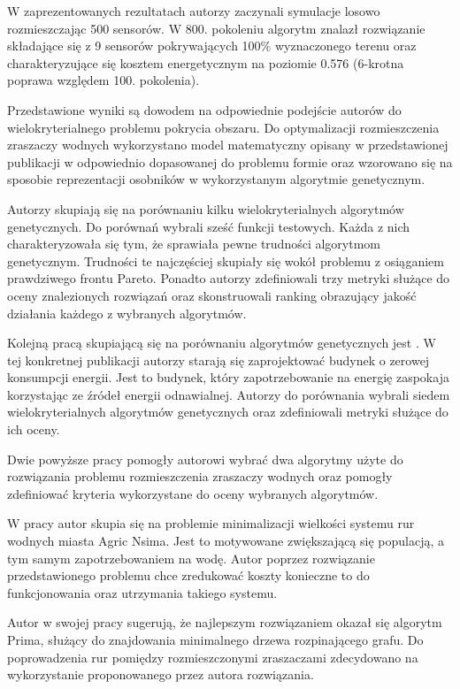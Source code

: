 \documentclass[twoside]{iisthesis}
\begin{document}
W zaprezentowanych rezultatach autorzy zaczynali symulacje losowo rozmieszczając 500 sensorów. W 800. pokoleniu algorytm znalazł rozwiązanie składające się z 9 sensorów pokrywających 100\% wyznaczonego terenu oraz charakteryzujące się kosztem energetycznym na poziomie 0.576 (6-krotna poprawa względem 100. pokolenia).

Przedstawione wyniki są dowodem na odpowiednie podejście autorów do wielokryterialnego problemu pokrycia obszaru. Do optymalizacji rozmieszczenia zraszaczy wodnych wykorzystano model matematyczny opisany w przedstawionej publikacji w odpowiednio dopasowanej do problemu formie oraz wzorowano się na sposobie reprezentacji osobników w wykorzystanym algorytmie genetycznym.

Autorzy \cite{comparison_deb} skupiają się na porównaniu kilku wielokryterialnych algorytmów genetycznych. Do porównań wybrali sześć funkcji testowych. Każda z nich charakteryzowała się tym, że sprawiała pewne trudności algorytmom genetycznym. Trudności te najczęściej skupiały się wokół problemu z osiąganiem prawdziwego frontu Pareto. Ponadto autorzy zdefiniowali trzy metryki służące do oceny znalezionych rozwiązań oraz skonstruowali ranking obrazujący jakość działania każdego z wybranych algorytmów.

Kolejną pracą skupiającą się na porównaniu algorytmów genetycznych jest \cite{comparison_2}. W tej konkretnej publikacji autorzy starają się zaprojektować budynek o zerowej konsumpcji energii. Jest to budynek, który zapotrzebowanie na energię zaspokaja korzystając ze źródeł energii odnawialnej. Autorzy do porównania wybrali siedem wielokryterialnych algorytmów genetycznych oraz zdefiniowali metryki służące do ich oceny.

Dwie powyższe pracy pomogły autorowi wybrać dwa algorytmy użyte do rozwiązania problemu rozmieszczenia zraszaczy wodnych oraz pomogły zdefiniować kryteria wykorzystane do oceny wybranych algorytmów.

W pracy \cite{pipes} autor skupia się na problemie minimalizacji wielkości systemu rur wodnych miasta Agric Nsima. Jest to motywowane zwiększającą się populacją, a tym samym zapotrzebowaniem na wodę. Autor poprzez rozwiązanie przedstawionego problemu chce zredukować koszty konieczne to do funkcjonowania oraz utrzymania takiego systemu.

Autor w swojej pracy sugerują, że najlepszym rozwiązaniem okazał się algorytm Prima, służący do znajdowania minimalnego drzewa rozpinającego grafu. Do poprowadzenia rur pomiędzy rozmieszczonymi zraszaczami zdecydowano na wykorzystanie proponowanego przez autora rozwiązania.
\end{document}

